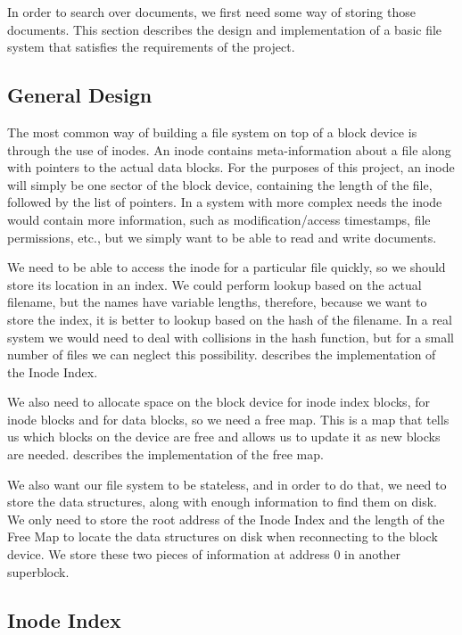 \documentclass[12pt,a4paper,twoside,openright]{report}
\begin{document}
In order to search over documents, we first need some way of storing those documents. This section describes the design and implementation of a basic file system that satisfies the requirements of the project.

\subsection{General Design}

The most common way of building a file system on top of a block device is through the use of inodes. An inode contains meta-information about a file along with pointers to the actual data blocks. For the purposes of this project, an inode will simply be one sector of the block device, containing the length of the file, followed by the list of pointers. In a system with more complex needs the inode would contain more information, such as modification/access timestamps, file permissions, etc., but we simply want to be able to read and write documents.

We need to be able to access the inode for a particular file quickly, so we should store its location in an index. We could perform lookup based on the actual filename, but the names have variable lengths, therefore, because we want to store the index, it is better to lookup based on the hash of the filename. In a real system we would need to deal with collisions in the hash function, but for a small number of files we can neglect this possibility.  describes the implementation of the Inode Index.

We also need to allocate space on the block device for inode index blocks, for inode blocks and for data blocks, so we need a free map. This is a map that tells us which blocks on the device are free and allows us to update it as new blocks are needed.  describes the implementation of the free map.

We also want our file system to be stateless, and in order to do that, we need to store the data structures, along with enough information to find them on disk. We only need to store the root address of the Inode Index and the length of the Free Map to locate the data structures on disk when reconnecting to the block device. We store these two pieces of information at address 0 in another superblock.

\subsection{Inode Index}
\label{subsec:inodeindex}
\end{document}

